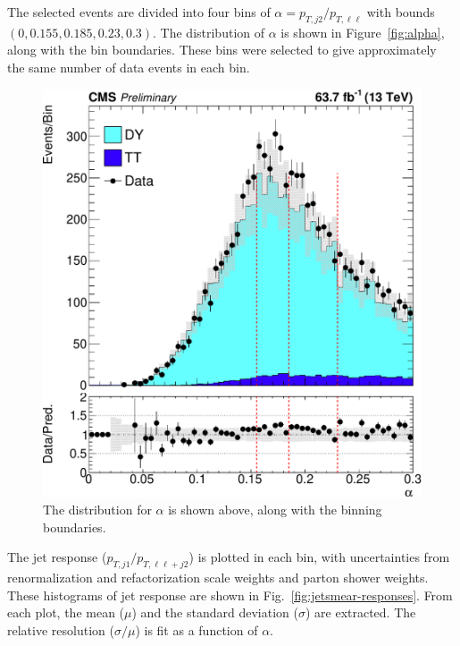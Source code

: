 The selected events are divided into four bins of $\alpha = p_{T,j2}/p_{T, \ell\ell}$
with bounds $(0, 0.155, 0.185, 0.23, 0.3)$.
The distribution of $\alpha$ is shown in Figure~\ref{fig:alpha}, along with the bin boundaries.
These bins were selected to give approximately the same number of data events in each bin.
%
\begin{figure}
  \centering
  \includegraphics[width=0.6\linewidth]{figures/200303_alpha_lines_v2/smearplot_alpha.pdf}
  \caption[Distribution of $\alpha$ used for $b$ jet energy smearing]{
    The distribution for $\alpha$ is shown above, along with the binning boundaries.
  }
\end{figure}
%
The jet response ($p_{T, j1}/p_{T, \ell\ell + j2}$) is plotted in each bin,
with uncertainties from renormalization and refactorization scale weights
and parton shower weights.
These histograms of jet response are shown in Fig.~\ref{fig:jetsmear-responses}.
From each plot, the mean ($\mu$) and the standard deviation ($\sigma$) are extracted.
The relative resolution ($\sigma/\mu$) is fit as a function of $\alpha$.

